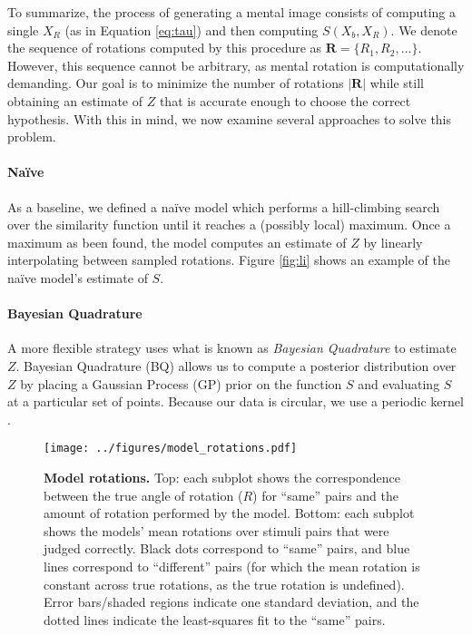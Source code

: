 \documentclass{article} %
\newcommand{\naive}[0]{na\"ive}
\newcommand{\Naive}[0]{Na\"ive}
\begin{document}
To summarize, the process of generating a mental image consists of
computing a single $X_R$ (as in Equation \ref{eq:tau}) and then
computing $S(X_b, X_R)$. We denote the sequence of rotations computed
by this procedure as $\mathbf{R}=\{R_1, R_2, \ldots{}\}$. However,
this sequence cannot be arbitrary, as mental rotation is
computationally demanding. Our goal is to minimize the number of
rotations $\vert\mathbf{R}\vert$ while still obtaining an estimate of
$Z$ that is accurate enough to choose the correct hypothesis. With
this in mind, we now examine several approaches to solve this problem.

\paragraph{\Naive{}}

As a baseline, we defined a \naive{} model which performs a
hill-climbing search over the similarity function until it reaches a
(possibly local) maximum. Once a maximum as been found, the model
computes an estimate of $Z$ by linearly interpolating between sampled
rotations. Figure \ref{fig:li} shows an example of the \naive{}
model's estimate of $S$.

\paragraph{Bayesian Quadrature}

A more flexible strategy uses what is known as \emph{Bayesian
  Quadrature} \cite{Diaconis:1988uo,OHagan:1991tx} to estimate $Z$.
Bayesian Quadrature (BQ) allows us to compute a posterior distribution
over $Z$ by placing a Gaussian Process (GP) prior on the function $S$
and evaluating $S$ at a particular set of points. Because our data is
circular, we use a periodic kernel \cite{Rasmussen:2006vz}.

\begin{figure}[t]
  \centering
  \texttt{[image: ../figures/model\_rotations.pdf]}
  \caption{\textbf{Model rotations.} Top: each subplot shows the
    correspondence between the true angle of rotation ($R$) for
    ``same'' pairs and the amount of rotation performed by the
    model. Bottom: each subplot shows the models' mean rotations over
    stimuli pairs that were judged correctly. Black dots correspond to
    ``same'' pairs, and blue lines correspond to ``different'' pairs
    (for which the mean rotation is constant across true rotations, as
    the true rotation is undefined). Error bars/shaded regions
    indicate one standard deviation, and the dotted lines indicate the
    least-squares fit to the ``same'' pairs.}
  \label{fig:rotations}
\end{figure}
\end{document}

